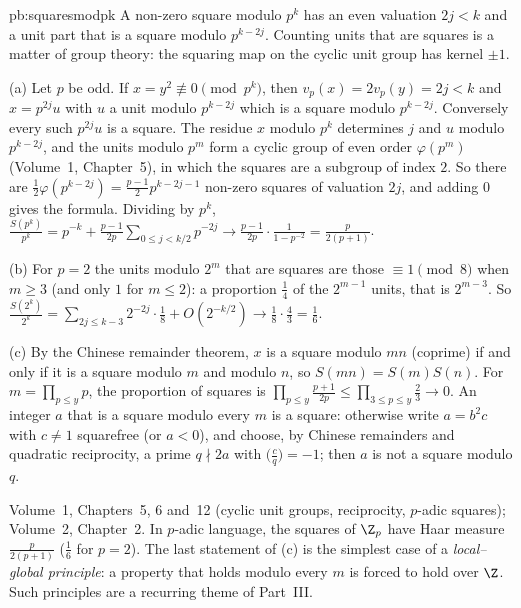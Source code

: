 \begin{solution}{pb:squaresmodpk}
\idea A non-zero square modulo $p^k$ has an even valuation $2j<k$ and a unit part that is a square modulo $p^{k-2j}$. Counting
units that are squares is a matter of group theory: the squaring map on the cyclic unit group has kernel $\pm1$.

\writeup (a) Let $p$ be odd. If $x=y^2\not\equiv0\pmod{p^k}$, then $v_p(x)=2v_p(y)=2j<k$ and $x=p^{2j}u$ with $u$ a unit modulo $p^{k-2j}$ which is a
square modulo $p^{k-2j}$. Conversely every such $p^{2j}u$ is a square. The residue $x$ modulo $p^k$ determines $j$ and $u$ modulo $p^{k-2j}$,
and the units modulo $p^m$ form a cyclic group of even order $\varphi(p^m)$ (Volume~1, Chapter~5), in which the squares are a subgroup of
index $2$. So there are $\frac12\varphi(p^{k-2j})=\frac{p-1}2p^{k-2j-1}$ non-zero squares of valuation $2j$, and adding $0$ gives the formula.
Dividing by $p^k$, $\frac{S(p^k)}{p^k}=p^{-k}+\frac{p-1}{2p}\sum_{0\le j<k/2}p^{-2j}\to\frac{p-1}{2p}\cdot\frac1{1-p^{-2}}=\frac p{2(p+1)}$.

(b) For $p=2$ the units modulo $2^m$ that are squares are those $\equiv1\pmod8$ when $m\ge3$ (and only $1$ for $m\le2$): a proportion
$\frac14$ of the $2^{m-1}$ units, that is $2^{m-3}$. So $\frac{S(2^k)}{2^k}=\sum_{2j\le k-3}2^{-2j}\cdot\frac18+O(2^{-k/2})\to\frac18\cdot\frac43=\frac16$.

(c) By the Chinese remainder theorem, $x$ is a square modulo $mn$ (coprime) if and only if it is a square modulo $m$ and modulo $n$,
so $S(mn)=S(m)S(n)$. For $m=\prod_{p\le y}p$, the proportion of squares is $\prod_{p\le y}\frac{p+1}{2p}\le\prod_{3\le p\le y}\frac23\to0$. An
integer $a$ that is a square modulo every $m$ is a square: otherwise write $a=b^2c$ with $c\ne1$ squarefree (or $a<0$), and choose,
by Chinese remainders and quadratic reciprocity, a prime $q\nmid2a$ with $\bigl(\frac cq\bigr)=-1$; then $a$ is not a square modulo $q$.

\tools Volume~1, Chapters~5, 6 and~12 (cyclic unit groups, reciprocity, $p$-adic squares); Volume~2, Chapter~2.
\leads In $p$-adic language, the squares of $\Z_p$ have Haar measure $\frac p{2(p+1)}$ ($\frac16$ for $p=2$). The last statement of (c)
is the simplest case of a \emph{local--global principle}: a property that holds modulo every $m$ is forced
to hold over $\Z$. Such principles are a recurring theme of Part~III.
\end{solution}

